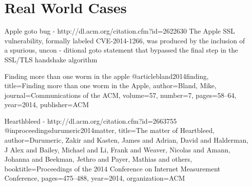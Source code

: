 \section{Real World Cases}

Apple goto bug - http://dl.acm.org/citation.cfm?id=2622630
The Apple SSL vulnerability, formally 
labeled CVE-2014-1266, was produced 
by the inclusion of a spurious, uncon
-
ditional 
goto
 statement that bypassed 
the final step in the SSL/TLS handshake 
algorithm

Finding more than one worm in the apple
@article{bland2014finding,
  title={Finding more than one worm in the Apple},
  author={Bland, Mike},
  journal={Communications of the ACM},
  volume={57},
  number={7},
  pages={58--64},
  year={2014},
  publisher={ACM}
}


Hearthbleed - http://dl.acm.org/citation.cfm?id=2663755
@inproceedings{durumeric2014matter,
  title={The matter of Heartbleed},
  author={Durumeric, Zakir and Kasten, James and Adrian, David and Halderman, J Alex and Bailey, Michael and Li, Frank and Weaver, Nicolas and Amann, Johanna and Beekman, Jethro and Payer, Mathias and others},
  booktitle={Proceedings of the 2014 Conference on Internet Measurement Conference},
  pages={475--488},
  year={2014},
  organization={ACM}
}

